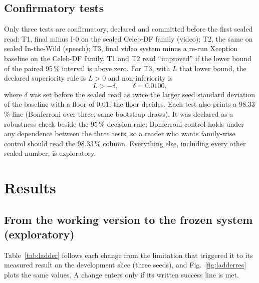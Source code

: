 \documentclass[conference,a4paper]{IEEEtran_nodash}
\begin{document}
\subsection{Confirmatory tests}
Only three tests are confirmatory, declared and committed before the first sealed
read: T1, final minus I-0 on the sealed Celeb-DF family (video); T2, the same on
sealed In-the-Wild (speech); T3, final video system minus a re-run Xception
baseline on the Celeb-DF family. T1 and T2 read ``improved'' if the lower bound of
the paired 95\,\% interval is above zero. For T3, with $L$ that lower bound, the
declared superiority rule is $L>0$ and non-inferiority is
\begin{equation}
L>-\delta,\qquad \delta=0.0100,
\end{equation}
where $\delta$ was set before the sealed read as twice the larger seed standard
deviation of the baseline with a floor of 0.01; the floor decides. Each test also
prints a 98.33\,\% line (Bonferroni over three, same bootstrap draws). It was
declared as a robustness check beside the 95\,\% decision rule; Bonferroni control
holds under any dependence between the three tests, so a reader who wants
family-wise control should read the 98.33\,\% column. Everything else, including
every other sealed number, is exploratory. %

\section{Results}\label{sec:results}

\subsection{From the working version to the frozen system (exploratory)}
Table~\ref{tab:ladder} follows each change from the limitation that triggered it
to its measured result on the development slice (three seeds), and
Fig.~\ref{fig:ladderres} plots the same values. A change enters only if its
written success line is met. %
\end{document}

